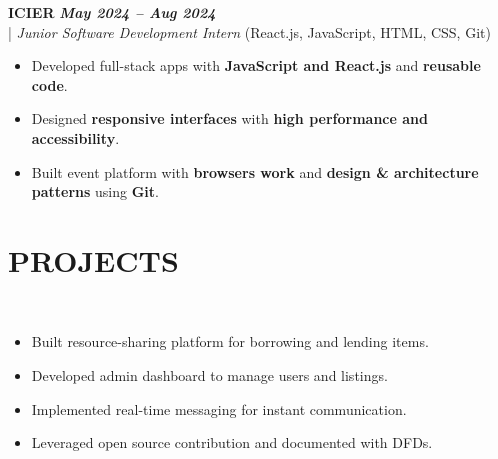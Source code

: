 \documentclass[10pt,a4paper]{article}
\begin{document}
\vspace{5pt}
\noindent
   \textbf{ICIER} \hfill \textit{\textbf{May 2024 -- Aug 2024}} \\
  \;|\;
  \textit{Junior Software Development Intern} (React.js, JavaScript, HTML, CSS, Git)
  \hfill

\begin{itemize}



\item Developed full-stack apps with \textbf{JavaScript and React.js} and \textbf{reusable code}.



\item Designed \textbf{responsive interfaces} with \textbf{high performance and accessibility}.



\item Built event platform with \textbf{browsers work} and \textbf{design \& architecture patterns} using \textbf{Git}.



\end{itemize}
\section*{PROJECTS}
\small

\noindent
{}\\[-12pt]
\begin{itemize}

\item Built resource-sharing platform for borrowing and lending items.

\item Developed admin dashboard to manage users and listings.

\item Implemented real-time messaging for instant communication.

\item Leveraged open source contribution and documented with DFDs.

\end{itemize}
\end{document}
